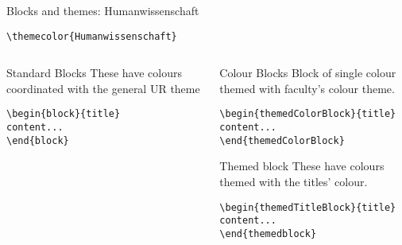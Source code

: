 \begingroup
{}
\begin{frame}[fragile]{Blocks and themes: Humanwissenschaft}
    \begin{center}\verb|\themecolor{Humanwissenschaft}|\end{center}
\begin{columns} %
\begin{column}{0.3\textwidth}
\begin{block}{Standard Blocks}
These have colours coordinated with the general UR theme
\begin{verbatim}
\begin{block}{title}
content...
\end{block}
\end{verbatim}
\end{block}
\end{column}
\begin{column}{0.7\textwidth}
\begin{themedColorBlock}{Colour Blocks}
Block of single colour themed with faculty's colour theme.
\small
\begin{verbatim}
\begin{themedColorBlock}{title}
content...
\end{themedColorBlock}
\end{verbatim}
\end{themedColorBlock}
\begin{themedTitleBlock} {Themed block}
These have colours themed with the titles' colour.
\small
\begin{verbatim}
\begin{themedTitleBlock}{title}
content...
\end{themedblock}
\end{verbatim}
\end{themedTitleBlock}
\end{column}
\end{columns}
\end{frame}
\endgroup
